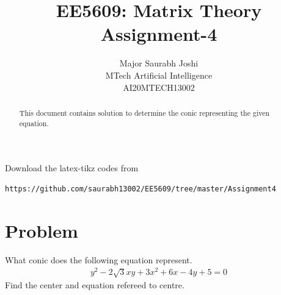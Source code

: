 \documentclass[journal,12pt,twocolumn]{IEEEtran}
\begin{document}
\makeatletter
{}
\makeatother
\let\StandardTheFigure\thefigure
\let\vec\mathbf
\renewcommand{\thefigure}{\theproblem}
\def\putbox#1#2#3{\makebox[0in][l]{\makebox[#1][l]{}\raisebox{\baselineskip}[0in][0in]{\raisebox{#2}[0in][0in]{#3}}}}
     \def\rightbox#1{\makebox[0in][r]{#1}}
     \def\centbox#1{\makebox[0in]{#1}}
     \def\topbox#1{\raisebox{-\baselineskip}[0in][0in]{#1}}
     \def\midbox#1{\raisebox{-0.5\baselineskip}[0in][0in]{#1}}
\vspace{3cm}
\title{EE5609: Matrix Theory\\
          Assignment-4\\}
\author{Major Saurabh Joshi\\MTech Artificial Intelligence\\AI20MTECH13002 }
\maketitle
\newpage
\bigskip
\renewcommand{\thefigure}{\theenumi}
\renewcommand{\thetable}{\theenumi}
\begin{abstract}
This document contains solution to determine the conic representing the given equation. 
\end{abstract}
Download the latex-tikz codes from 
%
%
%
\begin{lstlisting}
https://github.com/saurabh13002/EE5609/tree/master/Assignment4
\end{lstlisting}
%
\section{Problem}
What conic does the following equation represent. 
\begin{align*}
y^2-2\sqrt{3}xy+3x^2+6x-4y+5 = 0
\end{align*}
Find the center and equation refereed to centre.
\end{document}
